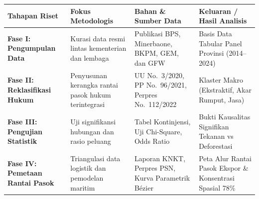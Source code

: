 \documentclass[
]{article}
\newcounter{none} %
\begin{document}
{\def\LTcaptype{none} %
\begin{longtable}[]{@{}
  >{\raggedright\arraybackslash}p{}
  >{\raggedright\arraybackslash}p{}
  >{\raggedright\arraybackslash}p{}
  >{\raggedright\arraybackslash}p{}@{}}
\toprule\noalign{}
\begin{minipage}[b]{\linewidth}\raggedright
Tahapan Riset
\end{minipage} & \begin{minipage}[b]{\linewidth}\raggedright
Fokus Metodologis
\end{minipage} & \begin{minipage}[b]{\linewidth}\raggedright
Bahan \& Sumber Data
\end{minipage} & \begin{minipage}[b]{\linewidth}\raggedright
Keluaran / Hasil Analisis
\end{minipage} \\
\midrule\noalign{}
\endhead
\bottomrule\noalign{}
\endlastfoot
\textbf{Fase I: Pengumpulan Data} & Kurasi data resmi lintas kementerian
dan lembaga & Publikasi BPS, Minerbaone, BKPM, GEM, dan GFW & Basis Data
Tabular Panel Provinsi (2014--2024) \\
\textbf{Fase II: Reklasifikasi Hukum} & Penyusunan kerangka rantai pasok
hukum terintegrasi & UU No.~3/2020, PP No.~96/2021, Perpres No.~112/2022
& 3 Klaster Makro (Ekstraktif, Akar Rumput, Jasa) \\
\textbf{Fase III: Pengujian Statistik} & Uji signifikansi hubungan dan
rasio peluang & Tabel Kontinjensi, Uji Chi-Square, Odds Ratio & Bukti
Kausalitas Signifikan Tekanan vs Deforestasi \\
\textbf{Fase IV: Pemetaan Rantai Pasok} & Triangulasi data logistik dan
pemodelan maritim & Laporan KNKT, Perpres PSN, Kurva Parametrik Bézier &
Peta Alur Rantai Pasok Ekspor \& Konsentrasi Spasial 78\% \\
\end{longtable}
}
\end{document}
